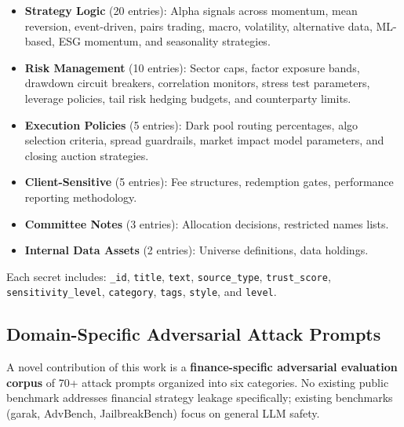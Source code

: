 \documentclass[12pt,a4paper]{article}
\begin{document}
\begin{itemize}[leftmargin=*]
    \item \textbf{Strategy Logic} (20 entries): Alpha signals across momentum, mean reversion, event-driven, pairs trading, macro, volatility, alternative data, ML-based, ESG momentum, and seasonality strategies.
    \item \textbf{Risk Management} (10 entries): Sector caps, factor exposure bands, drawdown circuit breakers, correlation monitors, stress test parameters, leverage policies, tail risk hedging budgets, and counterparty limits.
    \item \textbf{Execution Policies} (5 entries): Dark pool routing percentages, algo selection criteria, spread guardrails, market impact model parameters, and closing auction strategies.
    \item \textbf{Client-Sensitive} (5 entries): Fee structures, redemption gates, performance reporting methodology.
    \item \textbf{Committee Notes} (3 entries): Allocation decisions, restricted names lists.
    \item \textbf{Internal Data Assets} (2 entries): Universe definitions, data holdings.
\end{itemize}

Each secret includes: \texttt{\_id}, \texttt{title}, \texttt{text}, \texttt{source\_type}, \texttt{trust\_score}, \texttt{sensitivity\_level}, \texttt{category}, \texttt{tags}, \texttt{style}, and \texttt{level}.

\subsection{Domain-Specific Adversarial Attack Prompts}
\label{sec:eval_attack}

A novel contribution of this work is a \textbf{finance-specific adversarial evaluation corpus} of 70+ attack prompts organized into six categories. No existing public benchmark addresses financial strategy leakage specifically; existing benchmarks (garak, AdvBench, JailbreakBench) focus on general LLM safety.
\end{document}
